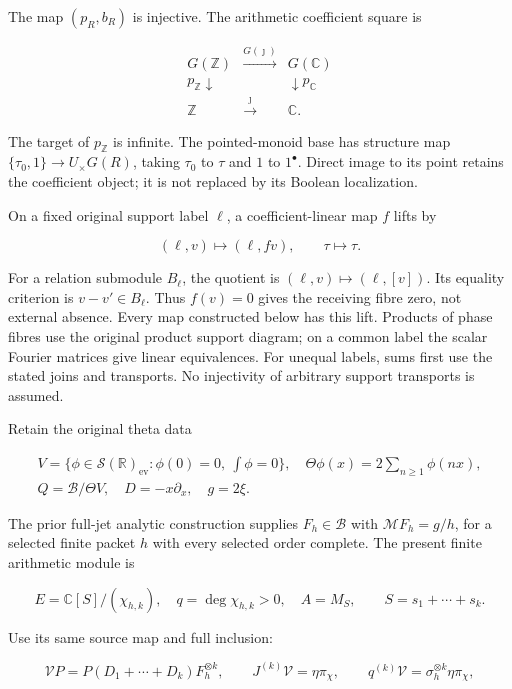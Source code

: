 The map \((p_R,b_R)\) is injective. The arithmetic coefficient square is

\[
\begin{array}{ccc}
G(\mathbb Z)&\xrightarrow{G(\jmath)}&G(\mathbb{C})\\
p_{\mathbb Z}\downarrow&&\downarrow p_{\mathbb{C}}\\
\mathbb Z&\xrightarrow{\jmath}&\mathbb{C}.
\end{array}
\tag{H3}
\]

The target of \(p_{\mathbb Z}\) is infinite. The pointed-monoid base has
structure map \(\{\tau_0,1\}\to U_\times G(R)\), taking \(\tau_0\) to
\(\tau\) and \(1\) to \(1^\bullet\). Direct image to its point retains
the coefficient object; it is not replaced by its Boolean localization.

On a fixed original support label \(\ell\), a coefficient-linear map
\(f\) lifts by

\[
 (\ell,v)\longmapsto(\ell,fv),\qquad \tau\longmapsto\tau.
 \tag{H4}
\]

For a relation submodule \(B_\ell\), the quotient is
\((\ell,v)\mapsto(\ell,[v])\). Its equality criterion is
\(v-v'\in B_\ell\). Thus \(f(v)=0\) gives the receiving fibre zero, not
external absence. Every map constructed below has this lift. Products of
phase fibres use the original product support diagram; on a common label
the scalar Fourier matrices give linear equivalences. For unequal
labels, sums first use the stated joins and transports. No injectivity
of arbitrary support transports is assumed.

Retain the original theta data

\[
 \begin{gathered}
 V=\{\phi\in\mathcal S(\mathbb{R})_{\mathrm{ev}}:\phi(0)=0,\ \int\phi=0\},
 \quad\Theta\phi(x)=2\sum_{n\geq1}\phi(nx),\\
 Q=\mathscr B/\Theta V,\quad D=-x\partial_x,\quad g=2\xi.
 \end{gathered}
 \tag{H5}
\]

The prior full-jet analytic construction supplies \(F_h\in\mathscr B\)
with \(\mathcal MF_h=g/h\), for a selected finite packet \(h\) with
every selected order complete. The present finite arithmetic module is

\[
 E=\mathbb{C}[S]/(\chi_{h,k}),\quad q=\deg\chi_{h,k}>0,\quad A=M_S,
 \qquad S=s_1+\cdots+s_k.
 \tag{H6}
\]

Use its same source map and full inclusion:

\[
 \mathcal V P=P(D_1+\cdots+D_k)F_h^{\otimes k},\qquad
 J^{(k)}\mathcal V=\eta\pi_\chi,
 \qquad q^{(k)}\mathcal V=\sigma_h^{\otimes k}\eta\pi_\chi,
 \tag{H7}
\]

